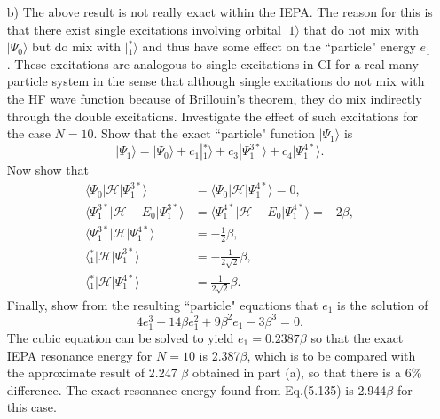 \documentclass[a4paper]{book}
\newcounter{exercise}[chapter]
\newcounter{solution}[chapter]
\begin{document}
\begin{exercise}
\begin{enumerate}
	\item[b)] The above result is not really exact within the IEPA. The reason for this is that there exist single excitations involving orbital $|1\rangle$ that do not mix with $|\Psi_0\rangle$ but do mix with $|{}^{*}_1 \rangle$ and thus have some effect on the ``particle" energy $e_1$. These excitations are analogous to single excitations in CI for a real many-particle system in the sense that although single excitations do not mix with the HF wave function because of Brillouin's theorem, they do mix indirectly through the double excitations. Investigate the effect of such excitations for the case $N=10$. Show that the exact ``particle" function $| \Psi_1 \rangle$ is
	\[
		| \Psi_1 \rangle = | \Psi_0 \rangle + c_1 |{}^{*}_1 \rangle + c_3 | \Psi^{3*}_1 \rangle + c_4 | \Psi^{4*}_1 \rangle.
	\]
	Now show that
	\begin{align*}
		\langle \Psi_0 | \mathscr{H} | \Psi^{3*}_1 \rangle &= \langle \Psi_0 | \mathscr{H} | \Psi^{4*}_1 \rangle = 0, \\
		\langle \Psi^{3*}_1 | \mathscr{H} - E_0 | \Psi^{3*}_1 \rangle &= \langle \Psi^{4*}_1 | \mathscr{H} - E_0 | \Psi^{4*}_1 \rangle = -2 \beta , \\
		\langle \Psi^{3*}_1 | \mathscr{H} | \Psi^{4*}_1 \rangle &= -\frac{1}{2} \beta , \\
		\langle {}^{*}_1 | \mathscr{H} | \Psi^{3*}_1 \rangle &= -\frac{1}{2\sqrt{2}} \beta , \\
		\langle {}^{*}_1 | \mathscr{H} | \Psi^{4*}_1 \rangle &= \frac{1}{2\sqrt{2}} \beta.
	\end{align*}
	Finally, show from  the resulting ``particle" equations that $e_1$ is the solution of 
	\[
		4e^3_1 + 14 \beta e^2_1 + 9 \beta^2 e_1 - 3\beta^3 = 0.
	\]
	The cubic equation can be solved to yield $e_1 = 0.2387 \beta$ so that the exact IEPA resonance energy for $N=10$ is 2.387$\beta$, which is to be compared with the approximate result of 2.247 $\beta$ obtained in part (a), so that there is a 6\% difference. The exact resonance energy found from Eq.(5.135) is 2.944$\beta$ for this case.
	\end{enumerate}
	\end{exercise}
	
\end{document}
